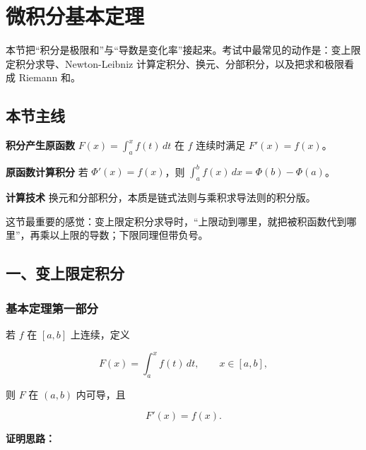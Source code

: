 \section{微积分基本定理}

本节把“积分是极限和”与“导数是变化率”接起来。考试中最常见的动作是：变上限定积分求导、Newton-Leibniz 计算定积分、换元、分部积分，以及把求和极限看成 Riemann 和。

\subsection*{本节主线}

\begin{conceptbox}
\textbf{积分产生原函数}
\(F(x)=\int_a^x f(t)\,dt\) 在 \(f\) 连续时满足 \(F'(x)=f(x)\)。
\end{conceptbox}

\begin{conceptbox}
\textbf{原函数计算积分}
若 \(\Phi'(x)=f(x)\)，则 \(\int_a^b f(x)\,dx=\Phi(b)-\Phi(a)\)。
\end{conceptbox}

\begin{conceptbox}
\textbf{计算技术}
换元和分部积分，本质是链式法则与乘积求导法则的积分版。
\end{conceptbox}

\begin{notebox}
这节最重要的感觉：变上限定积分求导时，“上限动到哪里，就把被积函数代到哪里”，再乘以上限的导数；下限同理但带负号。
\end{notebox}

\subsection*{一、变上限定积分}

\subsubsection*{基本定理第一部分}

若 \(f\) 在 \([a,b]\) 上连续，定义

\[
      F(x)=\int_a^x f(t)\,dt,\qquad x\in[a,b],
    \]

则 \(F\) 在 \((a,b)\) 内可导，且

\[
      F'(x)=f(x).
    \]

\textbf{证明思路：}

